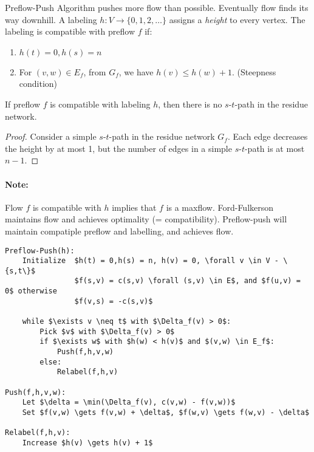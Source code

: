 Preflow-Push Algorithm pushes more flow than possible. Eventually flow finds its way downhill.
A labeling $h: V \rightarrow \{0, 1, 2, \ldots\}$ assigns a \emph{height} to every vertex. The labeling is compatible with preflow $f$ if:

\begin{enumerate}
\item $h(t) = 0, h(s) = n$
\item For $(v,w) \in E_f$, from $G_f$, we have $h(v) \le h(w) + 1$. \quad (Steepness condition)
\end{enumerate}

\begin{mylemma}
If preflow $f$ is compatible with labeling $h$, then there is no $s$-$t$-path in the residue network.
\end{mylemma}
\begin{proof}
Consider a simple $s$-$t$-path in the residue network $G_f$. Each edge decreases the height by at most 1, but the number of edges in a simple $s$-$t$-path is at most $n-1$.
\end{proof}

\paragraph{Note:} Flow $f$ is compatible with $h$ implies that $f$ is a maxflow. Ford-Fulkerson maintains flow and achieves optimality (= compatibility). Preflow-push will maintain compatiple preflow and labelling, and achieves flow.

\begin{lstlisting}[mathescape]
Preflow-Push(h):
    Initialize  $h(t) = 0,h(s) = n, h(v) = 0, \forall v \in V - \{s,t\}$
                $f(s,v) = c(s,v) \forall (s,v) \in E$, and $f(u,v) = 0$ otherwise
                $f(v,s) = -c(s,v)$
                
    while $\exists v \neq t$ with $\Delta_f(v) > 0$:
        Pick $v$ with $\Delta_f(v) > 0$
        if $\exists w$ with $h(w) < h(v)$ and $(v,w) \in E_f$:
            Push(f,h,v,w)
        else:
            Relabel(f,h,v)

Push(f,h,v,w):
    Let $\delta = \min(\Delta_f(v), c(v,w) - f(v,w))$
    Set $f(v,w) \gets f(v,w) + \delta$, $f(w,v) \gets f(w,v) - \delta$

Relabel(f,h,v):
    Increase $h(v) \gets h(v) + 1$
\end{lstlisting}
 
